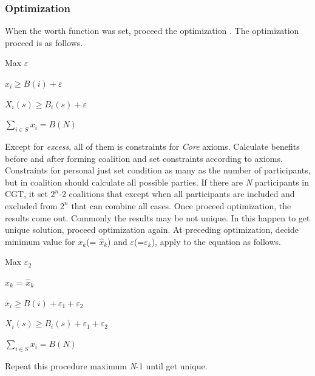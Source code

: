 \documentclass[journal]{IEEEtran} %
\begin{document}
\subsubsection{Optimization}
When the worth function was set, proceed the optimization . The optimization proceed is as follows.
\begin{center}
Max $\varepsilon$ \; \; \; \; \;\;\;\;\;\;\;\;\;
\end{center}
\begin{center}
\;\;\; $x_i \geq B(i) + \varepsilon$
\end{center}
\begin{center}
$X_i(s) \geq B_i(s) + \varepsilon$
\end{center}
\begin{center}
$\sum\limits_{i\in{S}} x_i = B(N)$ \;\;\;\;
\end{center}

Except for \textit{excess}, all of them is constraints for \textit{Core} axioms. Calculate benefits before and after forming coalition and set constraints according to axioms. Constraints for personal just set condition as many as the number of participants, but in coalition should calculate all possible parties. If there are \textit{N} participants in CGT, it set $2^n$-2 coalitions that except when all participants are included and excluded from $2^n$ that can combine all cases. Once proceed optimization, the results come out. Commonly the results may be not unique. In this happen to get unique solution, proceed optimization again. At preceding optimization, decide minimum value for $x_k$(= $\hat{x}_k$) and $\varepsilon$(=$\varepsilon_k$), apply to the equation as follows.

\begin{center}
Max $\varepsilon_2$ \; \; \; \; \; \; \; \;\;\;\;\;\;\;\;
\end{center}
\begin{center}
$x_k$ = $\hat{x}_k$ \; \; \; \; \;
\end{center}
\begin{center}
\;\;\;\;\;\;\;\;$x_i \geq B(i) + \varepsilon_1 + \varepsilon_2$
\end{center}
\begin{center}
\; \; $X_i(s) \geq B_i(s) + \varepsilon_1 + \varepsilon_2$ 
\end{center}
\begin{center}
$\sum\limits_{i\in{S}} x_i = B(N)$  \; \; \; \;\;\;
\end{center}
Repeat this procedure maximum \textit{N}-1 until get unique.
\end{document}

